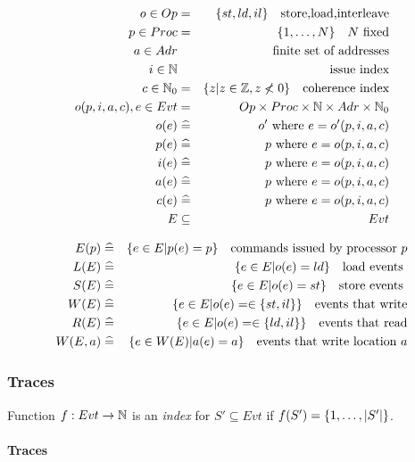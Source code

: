 \begin{eqnarray*}
   o \in Op &=& \{st,ld,il\} \quad \mbox{store,load,interleave}
\\ p \in Proc &=& \{1,\dots,N\} \quad N \mbox{ fixed}
\\ a \in Adr && \mbox{finite set of addresses}
\\ i \in \mathbb{N} && \mbox{issue index}
\\ c \in \mathbb{N}_0 &=& \{{z | z \in \mathbb{Z}, z \not< 0}\} \quad \mbox{coherence index}
\\ o(p,i,a,c), e \in Evt &=& Op \times Proc \times \mathbb{N} \times Adr \times \mathbb{N}_0
\\ o(e) &\mathrel{\widehat=}& o' \mbox{ where } e = o'(p,i,a,c)
\\ p(e) &\mathrel{\widehat=}& p \mbox{ where } e = o(p,i,a,c)
\\ i(e) &\mathrel{\widehat=}& p \mbox{ where } e = o(p,i,a,c)
\\ a(e) &\mathrel{\widehat=}& p \mbox{ where } e = o(p,i,a,c)
\\ c(e) &\mathrel{\widehat=}& p \mbox{ where } e = o(p,i,a,c)
\\ E &\subseteq& Evt
\end{eqnarray*}

\begin{eqnarray*}
   E(p) &\mathrel{\widehat=}& \{{e \in E | p(e) = p}\}
                \quad \mbox{commands issued by processor }p
\\ L(E) &\mathrel{\widehat=}& \{{e \in E | o(e) = ld}\} \quad \mbox{load events }
\\ S(E) &\mathrel{\widehat=}& \{{e \in E | o(e) = st}\} \quad \mbox{store events }
\\ W(E) &\mathrel{\widehat=}& \{{e \in E | o(e) = \in \{{st,il}\}}\}
                \quad \mbox{events that write}
\\ R(E) &\mathrel{\widehat=}& \{{e \in E | o(e) = \in \{{ld,il}\}}\}
                \quad \mbox{events that read}
\\ W(E,a) &\mathrel{\widehat=}& \{{e \in W(E) | a(e) = a}\}
                \quad \mbox{events that write location } a
\end{eqnarray*}

\subsubsection{Traces}

Function $f:Evt \mathrel{\rightarrow} \mathbb{N}$ is an \emph{index} for $S' \subseteq Evt$
if $f(S') = \{{1,\dots,|S'|}\}$.

\paragraph{Traces}

